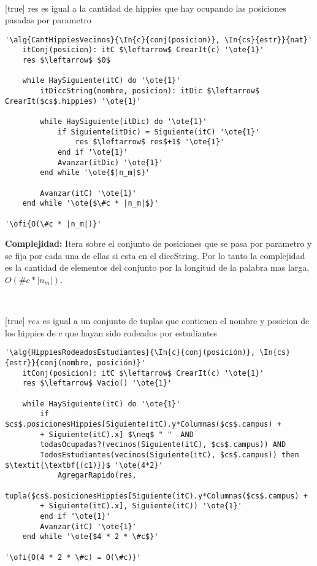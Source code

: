 ~


[true]
{res es igual a la cantidad de hippies que hay ocupando las posiciones pasadas por parametro}

\begin{lstlisting}[mathescape]
'\alg{CantHippiesVecinos}{\In{c}{conj(posicion)}, \In{cs}{estr}}{nat}'
	itConj(posicion): itC $\leftarrow$ CrearIt(c) '\ote{1}'
	res $\leftarrow$ $0$

	while HaySiguiente(itC) do '\ote{1}'
		itDiccString(nombre, posicion): itDic $\leftarrow$ CrearIt($cs$.hippies) '\ote{1}'

		while HaySiguiente(itDic) do '\ote{1}'
			if Siguiente(itDic) = Siguiente(itC) '\ote{1}'
				res $\leftarrow$ res$+1$ '\ote{1}'
			end if '\ote{1}'
			Avanzar(itDic) '\ote{1}'
		end while '\ote{$|n_m|$}'

		Avanzar(itC) '\ote{1}'
	end while '\ote{$\#c * |n_m|$}'

'\ofi{O(\#c * |n_m|)}'
\end{lstlisting}

\textbf{Complejidad:} Itera sobre el conjunto de posiciones que se pasa por parametro y se fija por cada una de ellas si esta en el diccString. Por lo tanto la complejidad es la cantidad de elementos del conjunto por la longitud de la palabra mas larga, $O(\#c * |n_m|)$.

~


[true]
{$res$ es igual a un conjunto de tuplas que contienen el nombre y posicion de los hippies de $c$ que hayan sido rodeados por estudiantes}

\begin{lstlisting}[mathescape]
'\alg{HippiesRodeadosEstudiantes}{\In{c}{conj(posición)}, \In{cs}{estr}}{conj(nombre, posición)}'
	itConj(posicion): itC $\leftarrow$ CrearIt(c) '\ote{1}'
	res $\leftarrow$ Vacio() '\ote{1}'

	while HaySiguiente(itC) do '\ote{1}'
		if $cs$.posicionesHippies[Siguiente(itC).y*Columnas($cs$.campus) +
		+ Siguiente(itC).x] $\neq$ " "  AND
		todasOcupadas?(vecinos(Siguiente(itC), $cs$.campus)) AND
		TodosEstudiantes(vecinos(Siguiente(itC), $cs$.campus)) then $\textit{\textbf{(c1)}}$ '\ote{4*2}'
			AgregarRapido(res,
				tupla($cs$.posicionesHippies[Siguiente(itC).y*Columnas($cs$.campus) +
		+ Siguiente(itC).x], Siguiente(itC)) '\ote{1}'
		end if '\ote{1}'
		Avanzar(itC) '\ote{1}'
	end while '\ote{$4 * 2 * \#c$}'

'\ofi{O(4 * 2 * \#c) = O(\#c)}'
\end{lstlisting}

